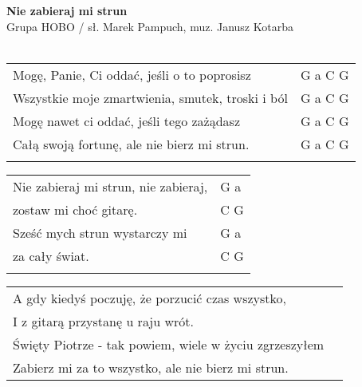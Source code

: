 \documentclass[a5paper]{article}
\begin{document}


\noindent
\fontsize{12pt}{15pt}\selectfont
\textbf{Nie zabieraj mi strun} \\
\fontsize{8pt}{10pt}\selectfont
Grupa HOBO / sł. Marek Pampuch, muz. Janusz Kotarba \\ \\
\fontsize{10pt}{12pt}\selectfont
{}
\begin{tabular}{@{}p{9.00cm}p{3cm}@{}}
\noindent
Mogę, Panie, Ci oddać, jeśli o to poprosisz & G a C G \\
Wszystkie moje zmartwienia, smutek, troski i ból & G a C G \\
Mogę nawet ci oddać, jeśli tego zażądasz & G a C G \\
Całą swoją fortunę, ale nie bierz mi strun. & G a C G \\ \\
\end{tabular}

\noindent
\begin{tabular}{@{}p{8.00cm}p{3cm}@{}}
Nie zabieraj mi strun, nie zabieraj, & G a \\
zostaw mi choć gitarę. & C G \\
Sześć mych strun wystarczy mi & G a \\
za cały świat. & C G \\ \\
\end{tabular}

\noindent
\begin{tabular}{@{}p{9.50cm}p{3cm}@{}}
A gdy kiedyś poczuję, że porzucić czas wszystko, \\
I z gitarą przystanę u raju wrót. \\
Święty Piotrze - tak powiem, wiele w życiu zgrzeszyłem \\
Zabierz mi za to wszystko, ale nie bierz mi strun.
\end{tabular}
\end{document}
